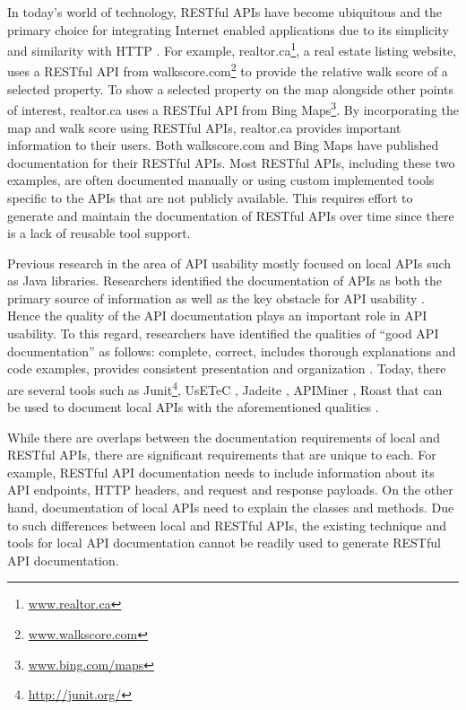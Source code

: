 \documentclass[11pt,oneside]{book}
\begin{document}
In today’s world of technology, RESTful APIs have become ubiquitous and the primary choice for integrating Internet enabled applications due to its simplicity and similarity with HTTP \cite{mangler2010origin}. For example, realtor.ca\footnote{\url{www.realtor.ca}}, a real estate listing website, uses a RESTful API from walkscore.com\footnote{\url{www.walkscore.com}} to provide the relative walk score of a selected property. To show a selected property on the map alongside other points of interest,  realtor.ca uses a RESTful API from Bing Maps\footnote{\url{www.bing.com/maps}}. By incorporating the map and walk score using RESTful APIs, realtor.ca provides important information to their users. Both walkscore.com and Bing Maps have published documentation for their RESTful APIs. Most RESTful APIs, including these two examples, are often documented manually or using custom implemented tools specific to the APIs that are not publicly available. This requires effort to generate and maintain the documentation of RESTful APIs over time since there is a lack of reusable tool support.

Previous research in the area of API usability mostly focused on local APIs such as Java libraries. Researchers identified the documentation of APIs as both the primary source of information as well as the key obstacle for API usability \cite{Robillard_what_makes}. Hence the quality of the API documentation plays an important role in API usability. To this regard, researchers have identified the qualities of ``good API documentation'' as follows: complete, correct, includes thorough explanations and code examples, provides consistent presentation and organization \cite{Robillard_what_makes,Myers_study}. Today, there are several tools such as Junit\footnote{\url{http://junit.org/}}, UsETeC \cite{zhu2014mining}, Jadeite \cite{Jadeite}, APIMiner \cite{montandon2013documenting}, Roast \cite{Hoffman_api_documentation} that can be used to document local APIs with the aforementioned qualities .

While there are overlaps between the documentation requirements of local and RESTful APIs, there are significant requirements that are unique to each. For example, RESTful API documentation needs to include information about its API endpoints, HTTP headers, and request and response payloads. On the other hand, documentation of local APIs need to explain the classes and methods. Due to such differences between local and RESTful APIs, the existing technique and tools for local API documentation cannot be readily used to generate RESTful API documentation.
\end{document}
